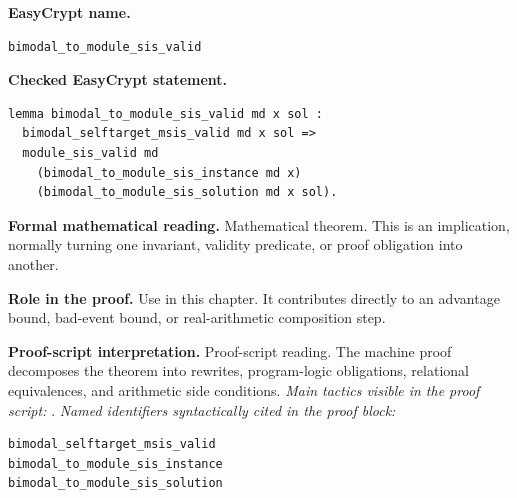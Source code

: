 \begin{formaltheorem}
\noindent\textbf{EasyCrypt name.}
\begin{lstlisting}[language=EasyCrypt,basicstyle=\ttfamily\scriptsize]
bimodal_to_module_sis_valid
\end{lstlisting}
\noindent\textbf{Checked EasyCrypt statement.}
\begin{lstlisting}[language=EasyCrypt,basicstyle=\ttfamily\scriptsize]
lemma bimodal_to_module_sis_valid md x sol :
  bimodal_selftarget_msis_valid md x sol =>
  module_sis_valid md
    (bimodal_to_module_sis_instance md x)
    (bimodal_to_module_sis_solution md x sol).
\end{lstlisting}
\noindent\textbf{Formal mathematical reading.}
Mathematical theorem. This is an implication, normally turning one invariant, validity predicate, or proof obligation into another.

\noindent\textbf{Role in the proof.}
Use in this chapter. It contributes directly to an advantage bound, bad-event bound, or real-arithmetic composition step.

\noindent\textbf{Proof-script interpretation.}
Proof-script reading. The machine proof decomposes the theorem into rewrites, program-logic obligations, relational equivalences, and arithmetic side conditions.
\emph{Main tactics visible in the proof script:} .
\emph{Named identifiers syntactically cited in the proof block:}
\begin{lstlisting}[language=EasyCrypt,basicstyle=\ttfamily\scriptsize]
bimodal_selftarget_msis_valid
bimodal_to_module_sis_instance
bimodal_to_module_sis_solution
\end{lstlisting}

\end{formaltheorem}

